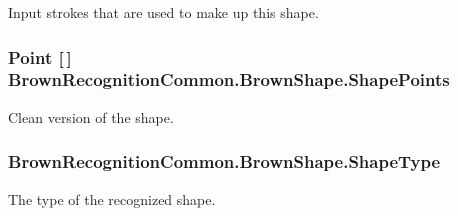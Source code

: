 \-Input strokes that are used to make up this shape. 

\hypertarget{class_brown_recognition_common_1_1_brown_shape_aabc4ccbd5ed1ba21c301b35d9f9d9fc9}{
\subsubsection[{\-Shape\-Points}]{\setlength{\rightskip}{0pt plus 5cm}\-Point \mbox{[}$\,$\mbox{]} {\bf \-Brown\-Recognition\-Common.\-Brown\-Shape.\-Shape\-Points}}}
\label{class_brown_recognition_common_1_1_brown_shape_aabc4ccbd5ed1ba21c301b35d9f9d9fc9}


\-Clean version of the shape. 

\hypertarget{class_brown_recognition_common_1_1_brown_shape_ac8d0e1108308d8e197d5c2b3bc248d7f}{
\subsubsection[{\-Shape\-Type}]{ {\bf \-Brown\-Recognition\-Common.\-Brown\-Shape.\-Shape\-Type}}}
\label{class_brown_recognition_common_1_1_brown_shape_ac8d0e1108308d8e197d5c2b3bc248d7f}


\-The type of the recognized shape. 

